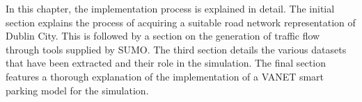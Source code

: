 In this chapter, the implementation process is explained in detail. The initial section explains the process of acquiring a suitable road network representation of Dublin City. This is followed by a section on the generation of traffic flow through tools supplied by \ac{SUMO}. The third section details the various datasets that have been extracted and their role in the simulation. The final section features a thorough explanation of the implementation of a \ac{VANET} smart parking model for the simulation.